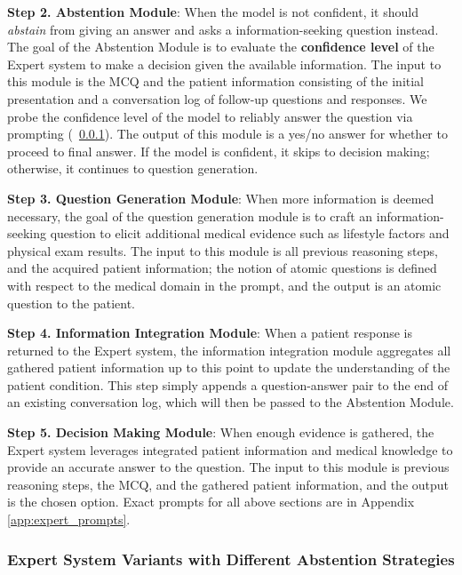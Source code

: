 \documentclass{article}
\newcommand{\Sref}[1]{\textsection~\ref{#1}}
\begin{document}
\textbf{Step 2. Abstention Module}:  When the model is not confident, it should \emph{abstain} from giving an answer and asks a information-seeking question instead. The goal of the Abstention Module is to evaluate the \textbf{confidence level} of the Expert system to make a decision given the available information. The input to this module is the MCQ and the patient information consisting of the initial presentation and a conversation log of follow-up questions and responses. We probe the confidence level of the model to reliably answer the question via prompting (\Sref{sec:method:expert:abstain}). The output of this module is a yes/no answer for whether to proceed to final answer. 
If the model is confident, it skips to decision making; otherwise, it continues to question generation. %

\textbf{Step 3. Question Generation Module}: 
When more information is deemed necessary, the goal of the question generation module is to craft an information-seeking question to elicit additional medical evidence such as lifestyle factors and physical exam results. The input to this module is all previous reasoning steps, and the acquired patient information; the notion of atomic questions is defined with respect to the medical domain in the prompt, and the output is an atomic question to the patient.%

\textbf{Step 4. Information Integration Module}: When a patient response is returned to the Expert system, the information integration module aggregates all gathered patient information up to this point to update the understanding of the patient condition. This step simply appends a question-answer pair to the end of an existing conversation log, which will then be passed to the Abstention Module.

\textbf{Step 5. Decision Making Module}: When enough evidence is gathered, the Expert system leverages integrated patient information and medical knowledge to provide an accurate answer to the question. The input to this module is previous reasoning steps, the MCQ, and the gathered patient information, and the output is the chosen option. Exact prompts for all above sections are in Appendix \ref{app:expert_prompts}.



\vspace{-0.5mm}
\subsubsection{Expert System Variants with Different Abstention Strategies}
\label{sec:method:expert:abstain}\vspace{-0.5mm}
\end{document}
